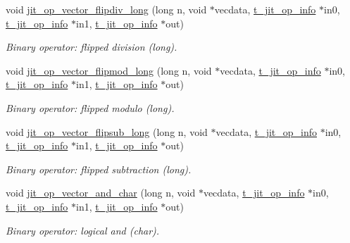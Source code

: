 \begin{DoxyCompactItemize}
void \hyperlink{group__opvecmod_gac88aff075d135ad68d64506f0127e788}{jit\_\-op\_\-vector\_\-flipdiv\_\-long} (long n, void $\ast$vecdata, \hyperlink{structt__jit__op__info}{t\_\-jit\_\-op\_\-info} $\ast$in0, \hyperlink{structt__jit__op__info}{t\_\-jit\_\-op\_\-info} $\ast$in1, \hyperlink{structt__jit__op__info}{t\_\-jit\_\-op\_\-info} $\ast$out)
\begin{DoxyCompactList}\small\item\em Binary operator: flipped division (long). \item\end{DoxyCompactList}\item 
void \hyperlink{group__opvecmod_ga3777baffdb18d40fb2d5b6c0af754459}{jit\_\-op\_\-vector\_\-flipmod\_\-long} (long n, void $\ast$vecdata, \hyperlink{structt__jit__op__info}{t\_\-jit\_\-op\_\-info} $\ast$in0, \hyperlink{structt__jit__op__info}{t\_\-jit\_\-op\_\-info} $\ast$in1, \hyperlink{structt__jit__op__info}{t\_\-jit\_\-op\_\-info} $\ast$out)
\begin{DoxyCompactList}\small\item\em Binary operator: flipped modulo (long). \item\end{DoxyCompactList}\item 
void \hyperlink{group__opvecmod_gaac636c8abca5ee168c14e535fca9eb78}{jit\_\-op\_\-vector\_\-flipsub\_\-long} (long n, void $\ast$vecdata, \hyperlink{structt__jit__op__info}{t\_\-jit\_\-op\_\-info} $\ast$in0, \hyperlink{structt__jit__op__info}{t\_\-jit\_\-op\_\-info} $\ast$in1, \hyperlink{structt__jit__op__info}{t\_\-jit\_\-op\_\-info} $\ast$out)
\begin{DoxyCompactList}\small\item\em Binary operator: flipped subtraction (long). \item\end{DoxyCompactList}\item 
void \hyperlink{group__opvecmod_ga3357a8134a44c8229dcfbbc94950bd5f}{jit\_\-op\_\-vector\_\-and\_\-char} (long n, void $\ast$vecdata, \hyperlink{structt__jit__op__info}{t\_\-jit\_\-op\_\-info} $\ast$in0, \hyperlink{structt__jit__op__info}{t\_\-jit\_\-op\_\-info} $\ast$in1, \hyperlink{structt__jit__op__info}{t\_\-jit\_\-op\_\-info} $\ast$out)
\begin{DoxyCompactList}\small\item\em Binary operator: logical and (char). \item\end{DoxyCompactList}\item 

\end{DoxyCompactItemize}
